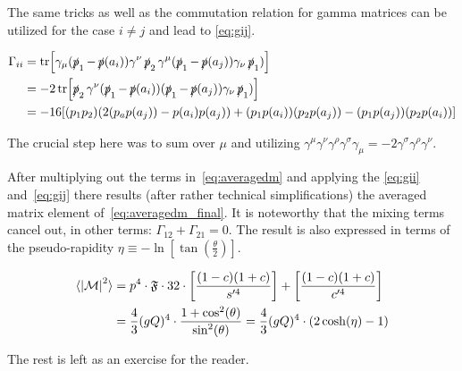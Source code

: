The same tricks as well as the commutation relation for gamma matrices
can be utilized for the case \(i\neq j\) and lead to
\ref{eq:gij}.

\begin{equation}
  \label{eq:gij}
  \begin{split}
\Gamma_{ii} &=
\tr[\gamma_\mu(\operatorname{\slashed{p}}_1-\operatorname{\slashed{p}}(a_i))\gamma^\nu\operatorname{\slashed{p}}_2\gamma^\mu(\operatorname{\slashed{p}}_1-\operatorname{\slashed{p}}(a_j))\gamma_\nu\operatorname{\slashed{p}}_1)]\\
&= -2\tr[\operatorname{\slashed{p}}_2\gamma^\nu(\operatorname{\slashed{p}}_1-\operatorname{\slashed{p}}(a_i))(\operatorname{\slashed{p}}_1-\operatorname{\slashed{p}}(a_j))\gamma_\nu\operatorname{\slashed{p}}_1)]
   \\
&=-16\qty[(p_1p_2)(2(p_ap(a_j)) - p(a_i)p(a_j)) +
(p_1p(a_i))(p_2p(a_j)) - (p_1p(a_j))(p_2p(a_i))]
\end{split}
\end{equation}

The crucial step here was to sum over \(\mu\) and utilizing
\(\gamma ^{\mu }\gamma ^{\nu }\gamma ^{\rho }\gamma ^{\sigma }\gamma
_{\mu }=-2\gamma ^{\sigma }\gamma ^{\rho }\gamma ^{\nu }\).


After multiplying out the terms in~\eqref{eq:averagedm} and applying
the \eqref{eq:gii} and~\eqref{eq:gij} there results (after
rather technical simplifications) the
averaged matrix element of~\eqref{eq:averagedm_final}. It is
noteworthy that the mixing terms cancel out, in other terms:
\(\Gamma_{12} + \Gamma_{21} = 0\). The result is also expressed in
terms of the pseudo-rapidity \(\eta \equiv -\ln[\tan(\frac{\theta}{2})]\).

\begin{equation}
  \label{eq:averagedm_final}
  \begin{split}
  \langle\abs{\mathcal{M}}^2\rangle &= p^4\cdot\mathfrak{F}\cdot
  32\cdot\qty[\frac{(1-c)(1+c)}{s'^4}] + \qty[\frac{(1-c)(1+c)}{c'^4}] \\
  &= \frac{4}{3}(gQ)^4 \cdot\frac{1+\cos^2(\theta)}{\sin^2(\theta)} =
  \frac{4}{3}(gQ)^4\cdot(2\cosh(\eta) - 1)
  \end{split}
\end{equation}

The rest is left as an exercise for the reader.
